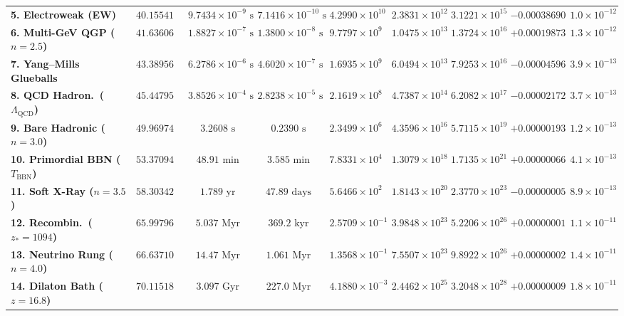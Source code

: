 \documentclass[11pt,a4paper]{article}
\theoremstyle{plain}
\theoremstyle{definition}
\theoremstyle{remark}
\numberwithin{equation}{section}
\begin{document}
\begin{table}[H]
{\begin{tabular}{@{} l c c c c c c c c @{}}
\textbf{5. Electroweak (EW)} & $40.15541725$ & $9.7434\times 10^{-9}\text{ s}$ & $7.1416\times 10^{-10}\text{ s}$ & $4.2990\times 10^{10}$ & $2.3831\times 10^{12}$ & $3.1221\times 10^{15}$ & $-0.000386907$ & $1.0\times 10^{-12}$ \\
\textbf{6. Multi-GeV QGP ($n=2.5$)} & $41.63606681$ & $1.8827\times 10^{-7}\text{ s}$ & $1.3800\times 10^{-8}\text{ s}$ & $9.7797\times 10^{9}$ & $1.0475\times 10^{13}$ & $1.3724\times 10^{16}$ & $+0.000198732$ & $1.3\times 10^{-12}$ \\
\textbf{7. Yang--Mills Glueballs} & $43.38956796$ & $6.2786\times 10^{-6}\text{ s}$ & $4.6020\times 10^{-7}\text{ s}$ & $1.6935\times 10^{9}$ & $6.0494\times 10^{13}$ & $7.9253\times 10^{16}$ & $-0.000045960$ & $3.9\times 10^{-13}$ \\
\textbf{8. QCD Hadron.\ ($\Lambda_{\text{QCD}}$)} & $45.44795609$ & $3.8526\times 10^{-4}\text{ s}$ & $2.8238\times 10^{-5}\text{ s}$ & $2.1619\times 10^{8}$ & $4.7387\times 10^{14}$ & $6.2082\times 10^{17}$ & $-0.000021724$ & $3.7\times 10^{-13}$ \\
\textbf{9. Bare Hadronic ($n=3.0$)} & $49.96974467$ & $3.2608\text{ s}$ & $0.2390\text{ s}$ & $2.3499\times 10^{6}$ & $4.3596\times 10^{16}$ & $5.7115\times 10^{19}$ & $+0.000001938$ & $1.2\times 10^{-13}$ \\
\textbf{10. Primordial BBN ($T_{\text{BBN}}$)} & $53.37094205$ & $48.91\text{ min}$ & $3.585\text{ min}$ & $7.8331\times 10^{4}$ & $1.3079\times 10^{18}$ & $1.7135\times 10^{21}$ & $+0.000000663$ & $4.1\times 10^{-13}$ \\
\textbf{11. Soft X-Ray ($n=3.5$)} & $58.30342253$ & $1.789\text{ yr}$ & $47.89\text{ days}$ & $5.6466\times 10^{2}$ & $1.8143\times 10^{20}$ & $2.3770\times 10^{23}$ & $-0.000000054$ & $8.9\times 10^{-13}$ \\
\textbf{12. Recombin.\ ($z_*=1094$)} & $65.99796467$ & $5.037\text{ Myr}$ & $369.2\text{ kyr}$ & $2.5709\times 10^{-1}$ & $3.9848\times 10^{23}$ & $5.2206\times 10^{26}$ & $+0.000000014$ & $1.1\times 10^{-11}$ \\
\textbf{13. Neutrino Rung ($n=4.0$)} & $66.63710039$ & $14.47\text{ Myr}$ & $1.061\text{ Myr}$ & $1.3568\times 10^{-1}$ & $7.5507\times 10^{23}$ & $9.8922\times 10^{26}$ & $+0.000000021$ & $1.4\times 10^{-11}$ \\
\textbf{14. Dilaton Bath ($z=16.8$)} & $70.11518320$ & $3.097\text{ Gyr}$ & $227.0\text{ Myr}$ & $4.1880\times 10^{-3}$ & $2.4462\times 10^{25}$ & $3.2048\times 10^{28}$ & $+0.000000093$ & $1.8\times 10^{-11}$ \\

\end{tabular}}
\end{table}
\end{document}
